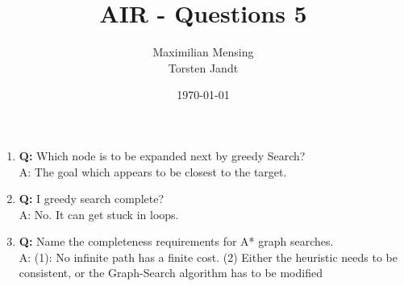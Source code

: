 \documentclass[a4paper,headsepline,12pt]{scrartcl}
\title{AIR - Questions 5}
\date{\today}
\author{Maximilian Mensing\\Torsten Jandt}
\begin{document}
\maketitle

\begin{enumerate}
    \item \textbf{Q:} Which node is to be expanded next by greedy Search? \\
    A: The goal which appears to be closest to the target.
    \item \textbf{Q:} I greedy search complete?\\
    A: No. It can get stuck in loops.
    \item \textbf{Q:} Name the completeness requirements for A* graph searches.\\
    A: (1): No infinite path has a finite cost. (2) Either the heuristic needs to be consistent, or the Graph-Search algorithm has to be modified
\end{enumerate}
\end{document}
